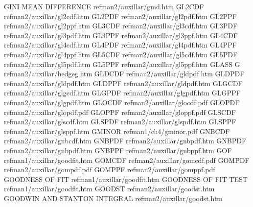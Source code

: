 GINI MEAN DIFFERENCE                    refman2/auxillar/gmd.htm
GL2CDF                                  refman2/auxillar/gl2cdf.htm
GL2PDF                                  refman2/auxillar/gl2pdf.htm
GL2PPF                                  refman2/auxillar/gl2ppf.htm
GL3CDF                                  refman2/auxillar/gl3cdf.htm
GL3PDF                                  refman2/auxillar/gl3pdf.htm
GL3PPF                                  refman2/auxillar/gl3ppf.htm
GL4CDF                                  refman2/auxillar/gl4cdf.htm
GL4PDF                                  refman2/auxillar/gl4pdf.htm
GL4PPF                                  refman2/auxillar/gl4ppf.htm
GL5CDF                                  refman2/auxillar/gl5cdf.htm
GL5PDF                                  refman2/auxillar/gl5pdf.htm
GL5PPF                                  refman2/auxillar/gl5ppf.htm
GLASS G                                 refman2/auxillar/hedgeg.htm
GLDCDF                                  refman2/auxillar/gldpdf.htm
GLDPDF                                  refman2/auxillar/gldpdf.htm
GLDPPF                                  refman2/auxillar/gldpdf.htm
GLGCDF                                  refman2/auxillar/glgcdf.htm
GLGPDF                                  refman2/auxillar/glgpdf.htm
GLGPPF                                  refman2/auxillar/glgpdf.htm
GLOCDF                                  refman2/auxillar/glocdf.pdf
GLOPDF                                  refman2/auxillar/glopdf.pdf
GLOPPF                                  refman2/auxillar/gloppf.pdf
GLSCDF                                  refman2/auxillar/glscdf.htm
GLSPDF                                  refman2/auxillar/glspdf.htm
GLSPPF                                  refman2/auxillar/glsppf.htm
GMINOR                                  refman1/ch4/gminor.pdf
GNBCDF                                  refman2/auxillar/gnbcdf.htm
GNBPDF                                  refman2/auxillar/gnbpdf.htm
GNBPDF                                  refman2/auxillar/gnbpdf.htm
GNBPPF                                  refman2/auxillar/gnbppf.htm
GOF                                     refman1/auxillar/goodfit.htm
GOMCDF                                  refman2/auxillar/gomcdf.pdf
GOMPDF                                  refman2/auxillar/gompdf.pdf
GOMPPF                                  refman2/auxillar/gomppf.pdf
GOODNESS OF FIT                         refman1/auxillar/goodfit.htm
GOODNESS OF FIT TEST                    refman1/auxillar/goodfit.htm
GOODST                                  refman2/auxillar/goodst.htm
GOODWIN AND STANTON INTEGRAL            refman2/auxillar/goodst.htm
